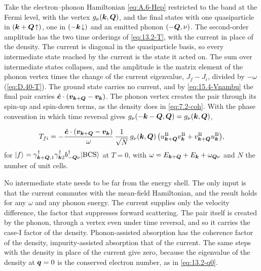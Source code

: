 Take the electron--phonon Hamiltonian \cref{eq:A.6-Hep} restricted to the band at the Fermi level, with the vertex $g_\nu(\bm{k},\bm{Q})$, and the final states with one quasiparticle in $(\bm{k}+\bm{Q}\!\uparrow)$, one in $(-\bm{k}\!\downarrow)$ and an emitted phonon $(-\bm{Q},\nu)$. The second-order amplitude has the two time orderings of \cref{eq:13.2-T}, with the current in place of the density. The current is diagonal in the quasiparticle basis, so every intermediate state reached by the current is the state it acted on. The sum over intermediate states collapses, and the amplitude is the matrix element of the phonon vertex times the change of the current eigenvalue, $J_f - J_i$, divided by $-\omega$ (\cref{eq:D.40-T}). The ground state carries no current, and by \cref{eq:15.4-Vnambu} the final pair carries $\hat{\bm{e}}\cdot(\bm{v}_{\bm{k}+\bm{Q}} - \bm{v}_{\bm{k}})$. The phonon vertex creates the pair through its spin-up and spin-down terms, as the density does in \cref{eq:7.2-coh}. With the phase convention in which time reversal gives $g_\nu(-\bm{k}-\bm{Q},\bm{Q}) = g_\nu(\bm{k},\bm{Q})$,
\begin{keyresult}
\begin{equation}
  T_{fi} = -\frac{\hat{\bm{e}}\cdot(\bm{v}_{\bm{k}+\bm{Q}} - \bm{v}_{\bm{k}})}{\omega}\,\frac{1}{\sqrt N}\,g_\nu(\bm{k},\bm{Q})\,\bigl(u^{\mathrm{B}}_{\bm{k}+\bm{Q}}v^{\mathrm{B}}_{\bm{k}} + v^{\mathrm{B}}_{\bm{k}+\bm{Q}}u^{\mathrm{B}}_{\bm{k}}\bigr) ,
  \label{eq:15.4-T}
\end{equation}
for $|f\rangle = \gamma^\dagger_{\bm{k}+\bm{Q},1}\gamma^\dagger_{\bm{k}2}b^\dagger_{-\bm{Q}\nu}|\mathrm{BCS}\rangle$ at $T = 0$, with $\omega = E_{\bm{k}+\bm{Q}} + E_{\bm{k}} + \omega_{\bm{Q}\nu}$ and $N$ the number of unit cells.
\end{keyresult}
\noindent No intermediate state needs to be far from the energy shell. The only input is that the current commutes with the mean-field Hamiltonian, and the result holds for any $\omega$ and any phonon energy. The current supplies only the velocity difference, the factor that suppresses forward scattering. The pair itself is created by the phonon, through a vertex even under time reversal, and so it carries the case-I factor of the density. Phonon-assisted absorption has the coherence factor of the density, impurity-assisted absorption that of the current. The same steps with the density in place of the current give zero, because the eigenvalue of the density at $\bm{q} = 0$ is the conserved electron number, as in \cref{eq:13.2-q0}.

